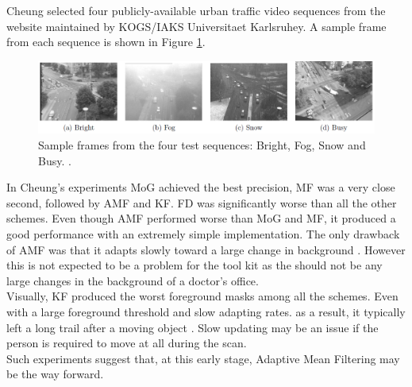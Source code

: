 Cheung \cite{Cheung2007} selected four publicly-available urban traffic video sequences from the website maintained by KOGS/IAKS Universitaet Karlsruhey. A sample frame from each sequence is shown in Figure \ref{fig:sample frames from the four test sequences: Bright, Fog, Snow and Busy}.\\ 

\begin{figure}[h]
\begin{center}
\includegraphics[scale=0.4]{./research/samples} 
\end{center}
\caption{Sample frames from the four test sequences: Bright, Fog, Snow and Busy. \cite{Cheung2007}.}
\label{fig:sample frames from the four test sequences: Bright, Fog, Snow and Busy}
\end{figure}

In Cheung's experiments \cite{Cheung2007} MoG achieved the best precision, MF was a very close second, followed by AMF and KF. FD was significantly worse than all the other schemes. Even though AMF performed worse than MoG and MF, it produced a good performance with an extremely simple implementation. The only drawback of AMF was that it adapts slowly toward a large change in background \cite{Cheung2007}. However this is not expected to be a problem for the tool kit as the should not be any large changes in the background of a doctor's office.\\

Visually, KF produced the worst foreground masks among all the schemes. Even with a large foreground threshold and slow adapting rates. as a result, it typically left a long trail after a moving object \cite{Cheung2007}. Slow updating may be an issue if the  person is required to move at all during the scan.\\

Such experiments suggest that, at this early stage, Adaptive Mean Filtering may be the way forward.\\